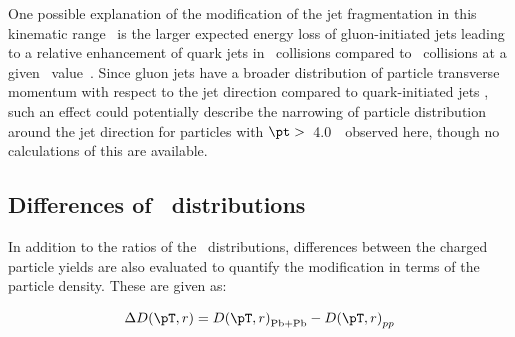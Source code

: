 One possible explanation of the modification of the 
jet fragmentation in this kinematic range~\cite{Aaboud:2018hpb} is the larger expected energy loss
of gluon-initiated jets leading to a relative enhancement of quark jets in \pbpb\ collisions compared
to \pp\ collisions at a given \ptjet\ value~\cite{Spousta:2015fca}. Since gluon jets have a broader distribution of particle transverse momentum with respect to the jet direction compared to quark-initiated jets \cite{OPAL:1995ab}
 , such an effect could potentially describe the narrowing of particle distribution around the jet direction for particles with $\pt >$~4.0~\GeV\
observed here, though no calculations of this are available.



\FloatBarrier


\subsection{Differences of \Dptr\ distributions}
In addition to the ratios of the \Dptr\ distributions, differences between the charged particle yields are also evaluated to quantify the modification in terms of the particle density. These are given as:

\begin{align}
\DeltaDptr = \Dptr_{\mathrm{Pb+Pb}} - \Dptr_{pp}
\end{align}

